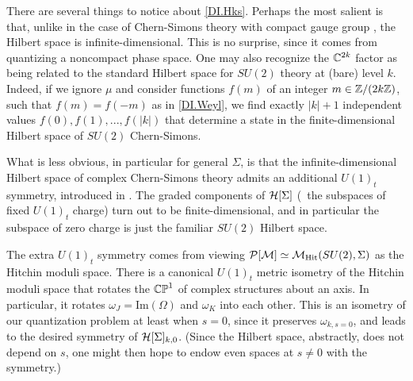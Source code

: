 \documentclass[12pt]{article}
\begin{document}
There are several things to notice about \eqref{DI.Hks}. Perhaps the most salient is that, unlike in the case of Chern-Simons theory with compact gauge group \cite{DIWit-Jones, DIaxelrod-witten}, the Hilbert space is infinite-dimensional. This is no surprise, since it comes from quantizing a noncompact phase space. One may also recognize the ${\mathbb C}^{2k}$ factor as being related to the standard Hilbert space for $SU(2)$ theory at (bare) level $k$. Indeed, if we ignore $\mu$ and consider functions $f(m)$ of an integer $m\in {\mathbb Z}/(2k{\mathbb Z})$, such that $f(m)=f(-m)$ as in \eqref{DI.Weyl}, we find exactly $|k|+1$ independent values $f(0),f(1),...,f(|k|)$ that determine a state in the finite-dimensional Hilbert space of $SU(2)$ Chern-Simons.


What is less obvious, in particular for general $\Sigma$, is that the infinite-dimensional Hilbert space of complex Chern-Simons theory admits an additional $U(1)_t$ symmetry, introduced in \cite{DIGukovPei}. The graded components of $\mathcal{H}[\Sigma]$ (\DIie\ the subspaces of fixed $U(1)_t$ charge) turn out to be finite-dimensional, and in particular the subspace of zero charge is just the familiar $SU(2)$ Hilbert space.

The extra $U(1)_t$ symmetry comes from viewing $\mathcal{P}[\mathcal{M}]\simeq \mathcal{M}_{\rm Hit}(SU(2),\Sigma)$ as the Hitchin moduli space. There is a canonical $U(1)_t$ metric isometry of the Hitchin moduli space that rotates the ${\mathbb{CP}}^1$ of complex structures about an axis. In particular, it rotates $\omega_J=\text{Im}(\Omega)$ and $\omega_K$ into each other. This is an isometry of our quantization problem at least when $s=0$, since it preserves $\omega_{k,s=0}$, and leads to the desired symmetry of $\mathcal{H}[\Sigma]_{k,0}$.
(Since the Hilbert space, abstractly, does not depend on $s$, one might then hope to endow even spaces at $s\neq 0$ with the symmetry.)
\end{document}

